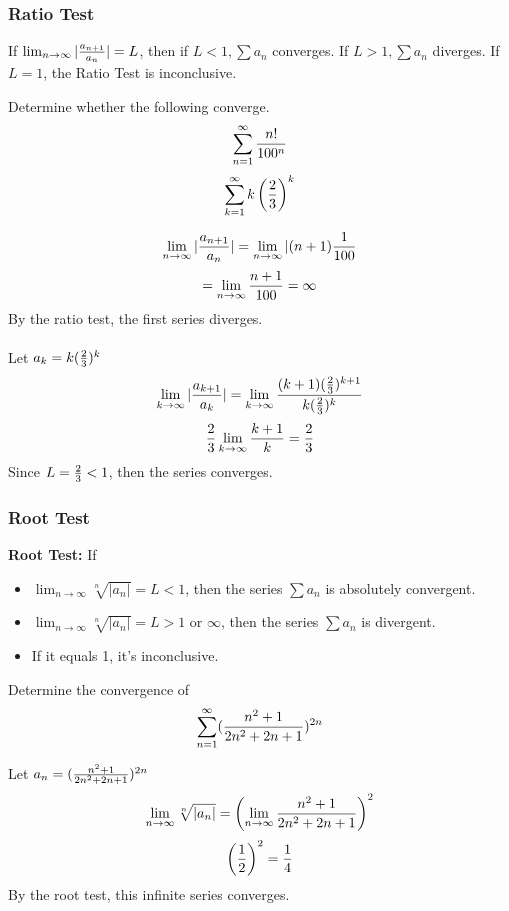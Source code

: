 \documentclass[english, 12pt]{article}
\begin{document}
\subsubsection{Ratio Test}
\begin{thrm}
If $\lim_{n\to\infty} |\frac{a_{n+1}}{a_{n}}| = L$, then if $L < 1, \sum a_{n}$ converges. If $L > 1, \sum a_{n}$ diverges. If $L=1$, the Ratio Test is inconclusive.
\end{thrm}
\begin{exmp}
Determine whether the following converge.
\[ \sum_{n=1}^\infty \frac{n!}{100^n} \]
\[ \sum_{k=1}^\infty k \left(\frac{2}{3}\right)^k \]
\begin{sol}
\[\lim_{n\to\infty} |\frac{a_{n+1}}{a_{n}}| = \lim_{n\to\infty} |(n+1)\frac{1}{100} \]
\[ = \lim_{n\to\infty} \frac{n+1}{100} = \infty \]
By the ratio test, the first series diverges.\\\\
Let $a_{k} = k(\frac{2}{3})^k$
\[\lim_{k\to\infty}|\frac{a_{k+1}}{a_{k}}| = \lim_{k\to\infty}\frac{(k+1)(\frac{2}{3})^{k+1}}{k(\frac{2}{3})^k} \]
\[ \frac{2}{3} \lim_{k\to\infty} \frac{k+1}{k} = \frac{2}{3} \]
Since $L=\frac{2}{3} < 1$, then the series converges.
\end{sol}
\end{exmp}
\subsubsection*{Root Test}
\begin{thrm}
\textbf{Root Test: } If
\begin{itemize}
\item $\lim_{n\to\infty} \sqrt[n]{|a_{n}|} = L < 1$, then the series $\sum a_{n}$ is absolutely convergent.
\item $\lim_{n\to\infty} \sqrt[n]{|a_{n}|} = L > 1$ or $\infty$, then the series $\sum a_{n}$ is divergent.
\item If it equals 1, it's inconclusive.
\end{itemize}
\end{thrm}

\begin{exmp}
Determine the convergence of
\[ \sum_{n=1}^\infty (\frac{n^2+1}{2n^2 + 2n + 1})^{2n} \]
\begin{sol}
Let $a_{n} = (\frac{n^2+1}{2n^2 + 2n + 1})^{2n}$
\[\lim_{n\to\infty} \sqrt[n]{|a_{n}|} = \left(\lim_{n\to \infty} \frac{n^2+1}{2n^2 + 2n + 1}\right)^2 \]
\[ \left(\frac{1}{2}\right)^2 = \frac{1}{4} \]
By the root test, this infinite series converges.

\end{sol}
\end{exmp}
\end{document}
